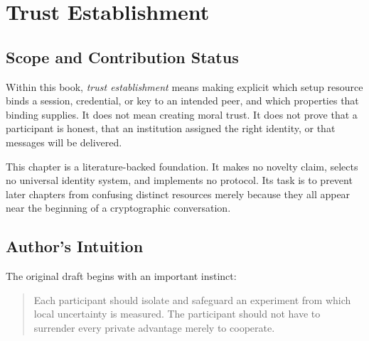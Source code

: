 \chapter{Trust Establishment}
\label{chap:trust-establishment}

\begin{abstract}
Parties cannot remove trust by naming a cryptographic primitive.  They can
instead make each trust assumption visible and ask which property depends on
it.  This chapter separates local entropy generation, public coordination,
unauthenticated key exchange, identity binding, authenticated key
establishment, and secret-key agreement from correlated observations.  Its
central boundary is simple: local randomness may create a private secret, but
it does not identify a remote participant.  The chapter presents a taxonomy
and research agenda, not a new key-establishment protocol or security theorem.
\end{abstract}

\section{Scope and Contribution Status}

Within this book, \emph{trust establishment} means making explicit which setup
resource binds a session, credential, or key to an intended peer, and which
properties that binding supplies.  It does not mean creating moral trust.  It
does not prove that a participant is honest, that an institution assigned the
right identity, or that messages will be delivered.

This chapter is a literature-backed foundation.  It makes no novelty claim,
selects no universal identity system, and implements no protocol.  Its task is
to prevent later chapters from confusing distinct resources merely because
they all appear near the beginning of a cryptographic conversation.

\section{Author's Intuition}

The original draft begins with an important instinct:

\begin{quote}
Each participant should isolate and safeguard an experiment from which local
uncertainty is measured.  The participant should not have to surrender every
private advantage merely to cooperate.
\end{quote}

